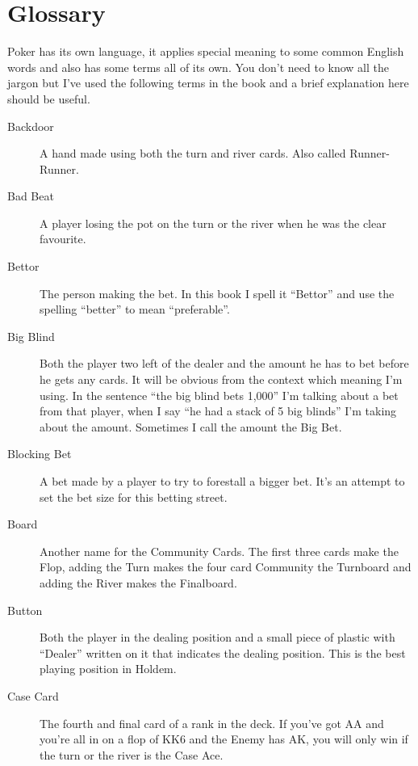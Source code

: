 \chapter{Glossary}



Poker has its own language, it applies special meaning to some
common English words and also has some terms all of its own. You
don't need to know all the jargon but I've used the following terms
in the book and a brief explanation here should be useful.

\begin{description}

\item[Backdoor] A hand made using both the turn and river cards. Also
called Runner-Runner.

\item[Bad Beat] A player losing the pot on the turn or the river when
he was the clear favourite.

\item[Bettor] The person making the bet. In this book I spell it ``Bettor''
and use the spelling ``better'' to mean ``preferable''.

\item[Big Blind] Both the player two left of the dealer and the amount
he has to bet before he gets any cards. It will be obvious from the
context which meaning I'm using. In the sentence ``the big blind bets
1,000'' I'm talking about a bet from that player, when I say ``he had
a stack of 5 big blinds'' I'm taking about the amount. Sometimes I
call the amount the Big Bet.

\item[Blocking Bet] A bet made by a player to try to forestall a
bigger bet. It's an attempt to set the bet size for this betting
street.

\item[Board] Another name for the Community Cards. The first three
cards make the Flop, adding the Turn makes the four card Community the
Turnboard and adding the River makes the Finalboard.

\item[Button] Both the player in the dealing position and a small
piece of plastic with ``Dealer'' written on it that indicates the
dealing position. This is the best playing position in Holdem.

\item[Case Card] The fourth and final card of a rank in the deck. If
you've got AA and you're all in on a flop of KK6 and the Enemy has AK,
you will only win if the turn or the river is the Case Ace.


\end{description}
